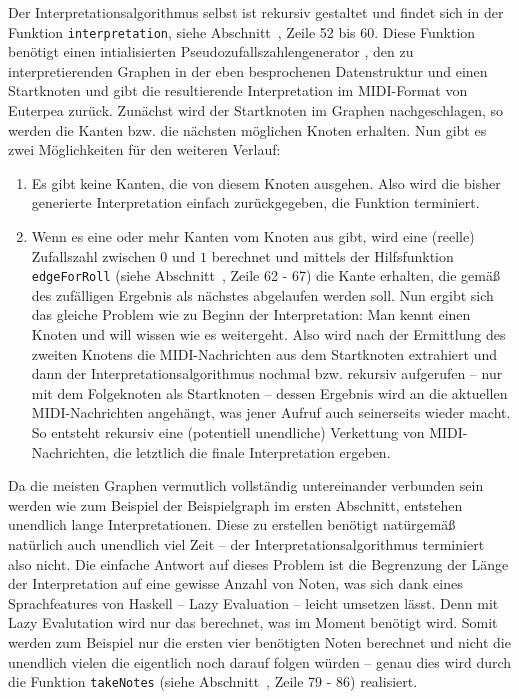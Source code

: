 \documentclass[a4paper,twocolumn]{article}
\begin{document}
Der Interpretationsalgorithmus selbst ist rekursiv \cite{wikipedia_rekursion} gestaltet und findet sich in
der Funktion \lstinline[basicstyle=\ttfamily]|interpretation|, siehe
Abschnitt~, Zeile 52 bis 60. Diese Funktion benötigt
einen intialisierten Pseudozufallszahlengenerator
\cite{random_random_gen,wikipedia_prng}, den
zu interpretierenden Graphen in der eben besprochenen Datenstruktur und einen
Startknoten und gibt die resultierende Interpretation im MIDI-Format von
Euterpea \cite{euterpea} zurück. Zunächst wird der Startknoten im Graphen
nachgeschlagen, so werden die Kanten bzw. die nächsten möglichen Knoten
erhalten. Nun gibt es zwei Möglichkeiten für den weiteren Verlauf:
\begin{enumerate}
  \item Es gibt keine Kanten, die von diesem Knoten ausgehen. Also wird die
    bisher generierte Interpretation einfach zurückgegeben, die Funktion
    terminiert.
  \item Wenn es eine oder mehr Kanten vom Knoten aus gibt, wird eine (reelle) Zufallszahl
    zwischen $0$ und $1$ berechnet und mittels der Hilfsfunktion \lstinline[basicstyle=\ttfamily]|edgeForRoll|
    (siehe Abschnitt~, Zeile 62 - 67) die
    Kante erhalten, die gemäß des zufälligen Ergebnis als nächstes abgelaufen werden
    soll. Nun ergibt sich das gleiche Problem wie zu Beginn der
    Interpretation: Man kennt einen Knoten und will wissen wie es weitergeht. Also
    wird nach der Ermittlung des zweiten Knotens die MIDI-Nachrichten aus dem
    Startknoten extrahiert und dann der Interpretationsalgorithmus nochmal bzw.
    rekursiv aufgerufen -- nur mit dem Folgeknoten als Startknoten -- dessen
    Ergebnis wird an die aktuellen MIDI-Nachrichten angehängt, was jener Aufruf auch
    seinerseits wieder macht. So entsteht rekursiv eine (potentiell unendliche)
    Verkettung von MIDI-Nachrichten, die letztlich die finale Interpretation ergeben.
\end{enumerate}

Da die meisten Graphen vermutlich vollständig untereinander verbunden sein
werden wie zum Beispiel der Beispielgraph im ersten Abschnitt, entstehen unendlich
lange Interpretationen. Diese zu erstellen benötigt natürgemäß natürlich auch
unendlich viel Zeit -- der Interpretationsalgorithmus terminiert also nicht.
Die einfache Antwort auf dieses Problem ist die Begrenzung der Länge der
Interpretation auf eine gewisse Anzahl von Noten, was sich dank eines
Sprachfeatures von Haskell -- Lazy Evaluation \cite{wikipedia_laziness} --
leicht umsetzen lässt. Denn mit Lazy Evalutation wird nur das berechnet, was im
Moment benötigt wird. Somit werden zum Beispiel nur die ersten vier benötigten
Noten berechnet und nicht die unendlich vielen die eigentlich noch darauf folgen
würden -- genau dies wird durch die Funktion
\lstinline[basicstyle=\ttfamily]|takeNotes| (siehe
Abschnitt~, Zeile 79 - 86) realisiert.
\end{document}
